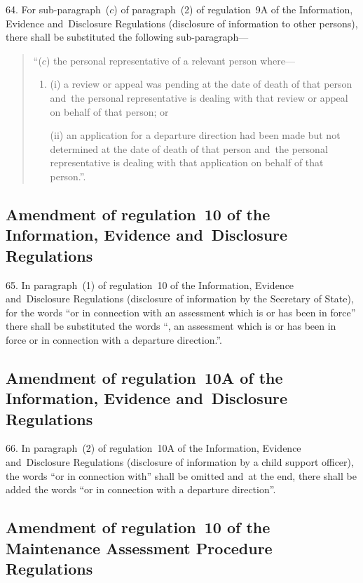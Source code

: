 \documentclass[12pt,a4paper]{article}
\begin{document}
64. For sub-paragraph~($c$) of paragraph~(2) of regulation~9A of the
Information, Evidence and~Disclosure Regulations (disclosure of information to
other persons), there shall be substituted the following sub-paragraph—
\begin{quotation}
“($c$) the personal representative of a relevant person where—
\begin{enumerate}\item[]
(i) a review or appeal was pending at the date of death of that person and~the
personal representative is dealing with that review or appeal on behalf of that
person; or

(ii) an application for a departure direction had been made but not determined at
the date of death of that person and~the personal representative is dealing with
that application on behalf of that person.”.
\end{enumerate}
\end{quotation}

\subsection[65. Amendment of regulation~10 of the Information, Evidence and~Disclosure
Regulations]{Amendment of regulation~10 of the Information, Evidence and~Disclosure
Regulations}

65. In paragraph~(1) of regulation~10 of the Information, Evidence
and~Disclosure Regulations (disclosure of information by the Secretary of
State), for the words “or in connection with an assessment which is or has been
in force” there shall be substituted the words “, an assessment which is or has
been in force or in connection with a departure direction.”.

\subsection[66. Amendment of regulation~10A of the Information, Evidence and~Disclosure
Regulations]{\sloppy Amendment of regulation~10A of the Information, Evidence and~Disclosure
Regulations}

66. In paragraph~(2) of regulation~10A of the Information, Evidence
and~Disclosure Regulations (disclosure of information by a child support
officer), the words “or in connection with” shall be omitted and~at the end,
there shall be added the words “or in connection with a departure direction”.

\subsection[67. Amendment of regulation~10 of the Maintenance Assessment Procedure
Regulations]{Amendment of regulation~10 of the Maintenance Assessment Procedure
Regulations}
\end{document}
